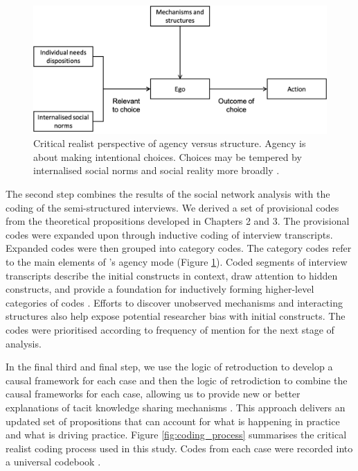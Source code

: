\begin{figure}[hbt!]
    \centering
    \includegraphics[width = \textwidth]{Images/agency_structure_loyal.png}
    \caption[Critical realist perspective of agency versus structure]{Critical realist perspective of agency versus structure. Agency is about making intentional choices. Choices may be tempered by internalised social norms and social reality more broadly \citep{loyal2001agency}.}
    \label{fig:agency_structure2}
\end{figure}

The second step combines the results of the social network analysis with the coding of the semi-structured interviews. We derived a set of provisional codes from the theoretical propositions developed in Chapters 2 and 3. The provisional codes were expanded upon through inductive coding of interview transcripts. Expanded codes were then grouped into category codes. The category codes refer to the main elements of \citeauthor{loyal2001agency}'s \citeyearpar{loyal2001agency} agency mode (Figure \ref{fig:agency_structure2}). Coded segments of interview transcripts describe the initial constructs in context, draw attention to hidden constructs, and provide a foundation for inductively forming higher-level categories of codes \citep{saldana2015coding}. Efforts to discover unobserved mechanisms and interacting structures also help expose potential researcher bias with initial constructs. The codes were prioritised according to frequency of mention for the next stage of analysis. \medskip

In the final third and final step, we use the logic of retroduction to develop a causal framework for each case and then the logic of retrodiction to combine the causal frameworks for each case, allowing us to provide new or better explanations of tacit knowledge sharing mechanisms \citep{mcavoy2018critical}. This approach delivers an updated set of propositions that can account for what is happening in practice and what is driving practice. Figure \ref{fig:coding_process} summarises the critical realist coding process used in this study. Codes from each case were recorded into a universal codebook \citep{guest2011applied}. 

